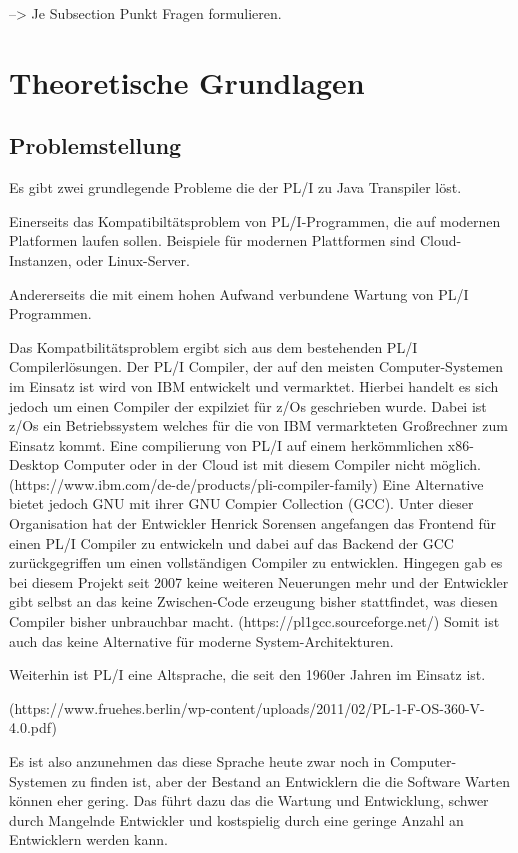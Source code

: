 --> Je Subsection Punkt Fragen formulieren.

\section{Theoretische Grundlagen}
	\subsection{Problemstellung}
	
	Es gibt zwei grundlegende Probleme die der PL/I zu Java Transpiler löst. 
	
	Einerseits das Kompatibiltätsproblem von PL/I-Programmen, die auf modernen Platformen laufen sollen. Beispiele für modernen Plattformen sind Cloud-Instanzen, oder Linux-Server. 
	
Andererseits die mit einem hohen Aufwand verbundene Wartung von PL/I Programmen. 
	
	Das Kompatbilitätsproblem ergibt sich aus dem bestehenden PL/I Compilerlösungen. Der PL/I Compiler, der auf den meisten Computer-Systemen im Einsatz ist wird von IBM entwickelt und vermarktet. Hierbei handelt es sich jedoch um einen Compiler der expilziet für z/Os geschrieben wurde. Dabei ist z/Os ein Betriebssystem welches für die von IBM vermarkteten Großrechner zum Einsatz kommt. Eine compilierung von PL/I auf einem herkömmlichen x86-Desktop Computer oder in der Cloud ist mit diesem Compiler nicht möglich. 
	(https://www.ibm.com/de-de/products/pli-compiler-family) 
	Eine Alternative bietet jedoch GNU mit ihrer GNU Compier Collection (GCC). Unter dieser Organisation hat der Entwickler Henrick Sorensen angefangen das Frontend für einen PL/I Compiler zu entwickeln und dabei auf das Backend der GCC zurückgegriffen um einen vollständigen Compiler zu entwicklen. Hingegen gab es bei diesem Projekt seit 2007 keine weiteren Neuerungen mehr und der Entwickler gibt selbst an das keine Zwischen-Code erzeugung bisher stattfindet, was diesen Compiler bisher unbrauchbar macht. 
	(https://pl1gcc.sourceforge.net/) 
	Somit ist auch das keine Alternative für moderne System-Architekturen. 
	
Weiterhin ist PL/I eine Altsprache, die seit den 1960er Jahren im Einsatz ist. 

(https://www.fruehes.berlin/wp-content/uploads/2011/02/PL-1-F-OS-360-V-4.0.pdf) 

Es ist also anzunehmen das diese Sprache heute zwar noch in Computer-Systemen zu finden ist, aber der Bestand an Entwicklern die die Software Warten können eher gering. Das führt dazu das die Wartung und Entwicklung, schwer durch Mangelnde Entwickler und kostspielig durch eine geringe Anzahl an Entwicklern werden kann.

